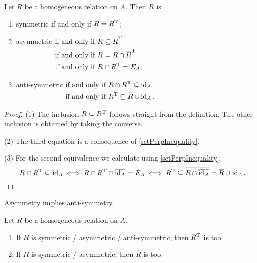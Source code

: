 \begin{lemma}
Let $R$ be a homogeneous relation on $A$. Then $R$ is
\begin{enumerate}
\item symmetric \textup{if and only if} $R = R^{\mathrm{T}}$;
\item asymmetric $\begin{aligned}[t]
&\text{\textup{if and only if}}\; R \subseteq \overline{R}^{\mathrm{T}} \\
&\text{\textup{if and only if}}\; R = R \cap \overline{R}^{\mathrm{T}} \\
&\text{\textup{if and only if}}\; R \cap R^{\mathrm{T}} = E_A;
\end{aligned}$
\item anti-symmetric $\begin{aligned}[t]
&\text{\textup{if and only if}}\; R\cap R^{\mathrm{T}} \subseteq \operatorname{id}_A \\
&\text{\textup{if and only if}}\; R^{\mathrm{T}}\subseteq \overline{R}\cup \operatorname{id}_A.
\end{aligned}$
\end{enumerate}
\end{lemma}
\begin{proof}
(1) The inclusion $R\subseteq R^{\mathrm{T}}$ follows straight from the definition. The other inclusion is obtained by taking the converse.

(2) The third equation is a consequence of \ref{setPerpInequality}.

(3) For the second equivalence we calculate using \ref{setPerpInequality}:
\[ R\cap R^{\mathrm{T}} \subseteq \operatorname{id}_A \iff R\cap R^{\mathrm{T}} \cap\overline{\operatorname{id}_A} = E_A \iff R^{\mathrm{T}} \subseteq \overline{R \cap \overline{\operatorname{id}_A}} = \overline{R} \cup \operatorname{id}_A. \]
\end{proof}
\begin{corollary} \label{asymmetryAntisymmetry}
Asymmetry implies anti-symmetry.
\end{corollary}

\begin{lemma}
Let $R$ be a homogeneous relation on $A$.
\begin{enumerate}
\item If $R$ is symmetric / asymmetric / anti-symmetric, then $R^{\mathrm{T}}$ is too.
\item If $R$ is symmetric / asymmetric, then $\overline{R}$ is too.
\end{enumerate}
\end{lemma}

